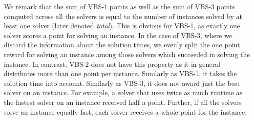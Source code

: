 \documentclass{elsarticle}
\begin{document}
We remark that the sum of VBS-1 points as well as the sum of VBS-3 points computed across all the solvers
is equal to the number of instances solved by at least one solver (later denoted \emph{total}).
This is obvious for VBS-1, as exactly one solver scores a point for solving an instance.
In the case of VBS-3, where we discard the information about the solution times, 
we evenly split the one point reward for solving an instance among those solvers which succeeded in solving the instance.
In contrast, VBS-2 does not have this property as it in general distributes more than one point per instance.
Similarly as VBS-1, it takes the solution time into account.
Similarly as VBS-3, it does not award just the best solver on an instance.
For example, a solver that uses twice as much runtime as  the fastest solver on an instance received half a point.
Further, if all the solvers solve an instance equally fast,
each solver receives a whole point for the instance. 
\end{document}
